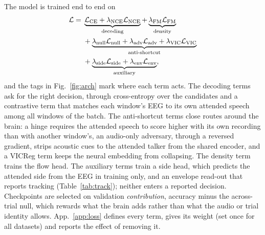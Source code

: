 \documentclass[10pt,twocolumn,letterpaper]{article}
\begin{document}
The model is trained end to end on
\begin{align}
\mathcal L={}&\underbrace{\mathcal L_{\rm CE}+\lambda_{\rm NCE}\mathcal L_{\rm NCE}}_{\text{decoding}}
+\underbrace{\lambda_{\rm FM}\mathcal L_{\rm FM}}_{\text{density}}\nonumber\\
&+\underbrace{\lambda_{\rm null}\mathcal L_{\rm null}+\lambda_{\rm adv}\mathcal L_{\rm adv}
+\lambda_{\rm VIC}\mathcal L_{\rm VIC}}_{\text{anti-shortcut}}\nonumber\\
&+\underbrace{\lambda_{\rm side}\mathcal L_{\rm side}+\lambda_{\rm env}\mathcal L_{\rm env}}_{\text{auxiliary}},
\label{eq:loss}
\end{align}
and the tags in Fig.~\ref{fig:arch} mark where each term acts. The decoding terms ask for
the right decision, through cross-entropy over the candidates and a contrastive term that
matches each window's EEG to its own attended speech among all windows of the batch. The
anti-shortcut terms close routes around the brain: a hinge requires the attended speech to
score higher with its own recording than with another window's, an audio-only adversary,
through a reversed gradient, strips acoustic cues to the attended talker from the shared
encoder, and a VICReg term keeps the neural embedding from collapsing. The density term trains the
flow head. The auxiliary terms train a side head, which predicts the attended side from the
EEG in training only, and an envelope read-out that reports tracking
(Table~\ref{tab:track}); neither enters a reported decision. Checkpoints are selected on
validation \emph{contribution}, accuracy minus the across-trial null, which rewards what the
brain adds rather than what the audio or trial identity allows. App.~\ref{app:loss} defines
every term, gives its weight (set once for all datasets) and reports the effect of removing
it.
\end{document}
